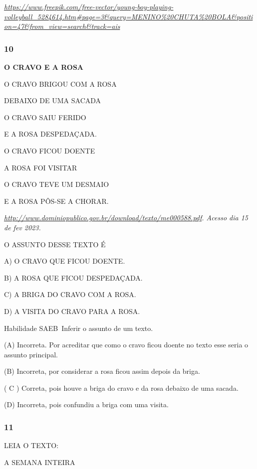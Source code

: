 \begin{escola}
\href{https://www.freepik.com/free-vector/young-boy-playing-volleyball_5284614.htm\#page=3\&query=MENINO\%20CHUTA\%20BOLA\&position=47\&from_view=search\&track=ais}{\emph{https://www.freepik.com/free-vector/young-boy-playing-volleyball\_5284614.htm\#page=3\&query=MENINO\%20CHUTA\%20BOLA\&position=47\&from\_view=search\&track=ais}}

\subsubsection{10}\label{section-35}

\textbf{O CRAVO E A ROSA}

O CRAVO BRIGOU COM A ROSA

DEBAIXO DE UMA SACADA

O CRAVO SAIU FERIDO

E A ROSA DESPEDAÇADA.

O CRAVO FICOU DOENTE

A ROSA FOI VISITAR

O CRAVO TEVE UM DESMAIO

E A ROSA PÔS-SE A CHORAR.

\emph{\url{http://www.dominiopublico.gov.br/download/texto/me000588.pdf}.
Acesso dia 15 de fev 2023.}

O ASSUNTO DESSE TEXTO É

A) O CRAVO QUE FICOU DOENTE.

B) A ROSA QUE FICOU DESPEDAÇADA.

C) A BRIGA DO CRAVO COM A ROSA.

D) A VISITA DO CRAVO PARA A ROSA.

Habilidade SAEB~Inferir o assunto de um texto.

\protect\hypertarget{_heading=h.4f1mdlm}{}{}(A) Incorreta. Por acreditar
que como o cravo ficou doente no texto esse seria o assunto principal.

(B) Incorreta, por considerar a rosa ficou assim depois da briga.

( C ) Correta, pois houve a briga do cravo e da rosa debaixo de uma
sacada.

(D) Incorreta, pois confundiu a briga com uma visita.

\subsubsection{11}\label{section-36}

LEIA O TEXTO:

A SEMANA INTEIRA


\end{escola}
